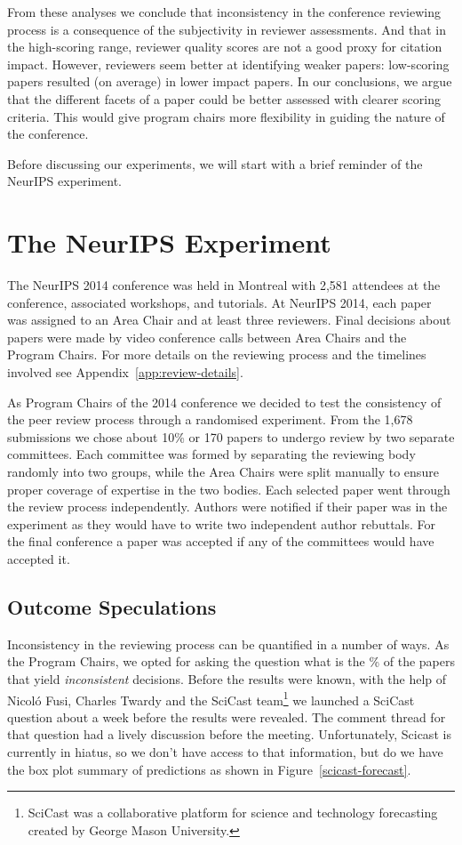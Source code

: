 \documentclass[twoside]{article}
\begin{document}
From these analyses we conclude that inconsistency in the conference
reviewing process is a consequence of the subjectivity in reviewer
assessments. And that in the high-scoring range, reviewer quality
scores are not a good proxy for citation impact. However, reviewers
seem better at identifying weaker papers: low-scoring papers resulted (on
average) in lower impact papers. In our conclusions, we argue that the different
facets of a paper could be better assessed with clearer scoring
criteria. This would give program chairs more flexibility in guiding
the nature of the conference.


Before discussing our experiments, we will start with a brief
reminder of the NeurIPS experiment.

\section{The NeurIPS Experiment}
\label{review-of-the-conference-and-the-experiment}

The NeurIPS 2014 conference was held in Montreal with 2,581 attendees at the
conference, associated workshops, and tutorials. At NeurIPS 2014, each paper was assigned to an Area Chair and at least
three reviewers. Final decisions about papers were made by video
conference calls between Area Chairs and the Program Chairs. For more details
on the reviewing process and the timelines involved see
Appendix~\ref{app:review-details}. 

As Program Chairs of the 2014 conference we decided to test the
consistency of the peer review process through a randomised experiment.
From the 1,678 submissions we chose about 10\% or 170 papers to undergo review by
two separate committees. Each committee was formed by separating the
reviewing body randomly into two groups, while the Area Chairs were
split manually to ensure proper coverage of expertise in the two bodies.
Each selected paper went through the review process
independently. Authors were notified if their paper was in the
experiment as they would have to write two independent author
rebuttals. For the final conference a paper was accepted if any of the
committees would have accepted it. 

\subsection{Outcome Speculations}

Inconsistency in the reviewing process can be quantified in a number
of ways. As the Program Chairs, we opted for asking the question what is the
\% of the papers that yield \emph{inconsistent} decisions.
Before the results were known, with the help of Nicol\'o Fusi, Charles Twardy and
the SciCast team\footnote{SciCast was a collaborative platform for science and technology forecasting created by George Mason University.} we launched a
SciCast question about a week before the results were revealed.  The comment
thread for that question had a lively discussion before the
meeting. Unfortunately, Scicast is currently in hiatus, so we don't have access to that information, but do we have the box plot summary of predictions as shown in Figure~\ref{scicast-forecast}. 
\end{document}
